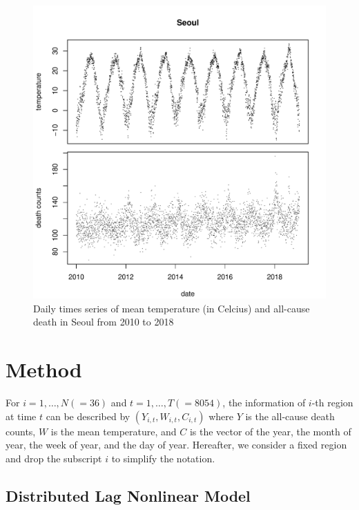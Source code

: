 \documentclass[12pt]{article}
\begin{document}
\begin{figure}
	\includegraphics[width = \textwidth]{figures/temporal-trend.pdf}
	\caption{
		Daily times series of 
		mean temperature (in Celcius) and all-cause death in Seoul from 2010 to 2018}
	\label{figure:temporal-trend}
\end{figure}


\section{Method} 
\label{section:method}

For $i = 1, \dots, N(=36)$ and $t = 1, \dots, T(=8054)$, 
the information of $i$-th region at time $t$ can be described by $(Y_{i,t}, W_{i,t}, C_{i,t})$ 
where $Y$ is the all-cause death counts, $W$ is the mean temperature, 
and $C$ is the vector of the year, the month of year, the week of year, and the day of year.
Hereafter, we consider a fixed region and drop the subscript $i$ to simplify the notation.

\subsection{Distributed Lag Nonlinear Model}
\label{section:dlnm}
\end{document}
